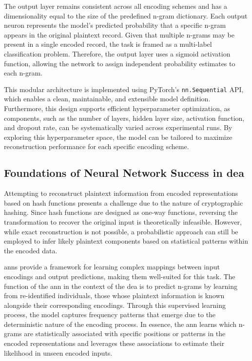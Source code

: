 The output layer remains consistent across all encoding schemes and has a dimensionality equal to the size of the predefined n-gram dictionary.
Each output neuron represents the model's predicted probability that a specific n-gram appears in the original plaintext record.
Given that multiple n-grams may be present in a single encoded record, the task is framed as a multi-label classification problem.
Therefore, the output layer uses a sigmoid activation function, allowing the network to assign independent probability estimates to each n-gram.

This modular architecture is implemented using PyTorch's \texttt{nn.Sequential} API, which enables a clean, maintainable, and extensible model definition.
Furthermore, this design supports efficient hyperparameter optimization, as components, such as the number of layers, hidden layer size, activation function, and dropout rate, can be systematically varied across experimental runs.
By exploring this hyperparameter space, the model can be tailored to maximize reconstruction performance for each specific encoding scheme.

\subsection{Foundations of Neural Network Success in \ac{dea}}

Attempting to reconstruct plaintext information from encoded representations based on hash functions presents a challenge due to the nature of cryptographic hashing.
Since hash functions are designed as one-way functions, reversing the transformation to recover the original input is theoretically infeasible.
However, while exact reconstruction is not possible, a probabilistic approach can still be employed to infer likely plaintext components based on statistical patterns within the encoded data.

\ac{ann}s provide a framework for learning complex mappings between input encodings and output predictions, making them well-suited for this task.
The function of the \ac{ann} in the context of the \ac{dea} is to predict n-grams by learning from re-identified individuals, those whose plaintext information is known alongside their corresponding encodings.
Through this supervised learning process, the model captures frequency patterns that emerge due to the deterministic nature of the encoding process.
In essence, the \ac{ann} learns which n-grams are statistically associated with specific positions or patterns in the encoded representations and leverages these associations to estimate their likelihood in unseen encoded inputs.

